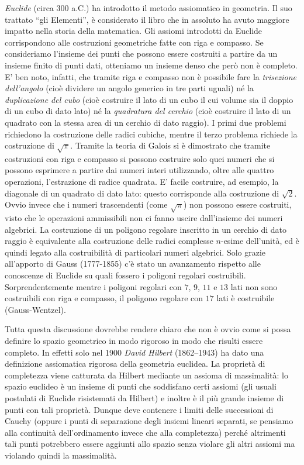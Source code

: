 \label{nota:Euclide}%
\label{nota:Hilbert}%
%
%
%
%
\emph{Euclide} (circa 300 a.C.) ha introdotto il metodo assiomatico in geometria. 
Il suo trattato ``gli Elementi'', è considerato il libro
che in assoluto ha avuto maggiore impatto nella storia della matematica.
Gli assiomi introdotti da Euclide corrispondono alle costruzioni geometriche fatte 
con riga e compasso.
Se consideriamo l'insieme dei punti che possono essere costruiti a partire da 
un insieme finito di punti dati, otteniamo un insieme denso che però 
non è completo. 
E' ben noto, infatti, che tramite riga e compasso non è possibile 
fare la \emph{trisezione dell'angolo} (cioè dividere 
un angolo generico in tre parti uguali)
né la \emph{duplicazione del cubo}
(cioè costruire il lato di un cubo il cui volume sia il doppio di un cubo di dato lato)
né la \emph{quadratura del cerchio} (cioè costruire il lato di un quadrato
con la stessa area di un cerchio di dato raggio).
I primi due problemi richiedono la costruzione delle radici cubiche, mentre 
il terzo problema richiede la costruzione di $\sqrt\pi$.
Tramite la teoria di Galois si è dimostrato che tramite costruzioni con riga e 
compasso si possono costruire solo quei numeri che si possono esprimere 
a partire dai numeri interi utilizzando, oltre alle quattro operazioni, 
l'estrazione di radice quadrata. 
E' facile costruire, ad esempio, la diagonale di un quadrato di dato lato: 
questo corrisponde alla costruzione di $\sqrt 2$.
Ovvio invece che i numeri trascendenti (come $\sqrt\pi$) non possono essere costruiti, visto 
che le operazioni ammissibili non ci fanno uscire dall'insieme dei numeri algebrici.
La costruzione di un poligono regolare inscritto in un cerchio di dato raggio 
è equivalente alla costruzione delle radici complesse $n$-esime dell'unità, ed 
è quindi legato alla costruibilità di particolari numeri algebrici. 
Solo grazie all'apporto di Gauss (1777-1855) c'è stato un avanzamento rispetto alle conoscenze di Euclide 
su quali fossero i poligoni regolari costruibili.
Sorprendentemente 
mentre i poligoni regolari con $7$, $9$, $11$ e $13$ lati non sono costruibili 
con riga e compasso, il poligono regolare con $17$ lati è costruibile
(Gauss-Wentzel). 

Tutta questa discussione dovrebbe rendere chiaro che non è ovvio come si possa 
definire lo spazio geometrico in modo rigoroso 
in modo che risulti essere completo. 
In effetti solo nel 1900 \emph{David Hilbert} (1862--1943) ha dato una definizione assiomatica rigorosa
della geometria euclidea. 
La proprietà di completezza viene catturata da Hilbert mediante un assioma di massimalità:
lo spazio euclideo è un insieme di punti che soddisfano certi assiomi 
(gli usuali postulati di Euclide risistemati da Hilbert) e inoltre 
è il più grande insieme di punti con tali proprietà. 
Dunque deve contenere i limiti delle successioni di Cauchy 
(oppure i punti di separazione degli insiemi lineari separati, 
se pensiamo alla continuità dell'ordinamento invece che alla completezza) 
perché altrimenti tali punti potrebbero essere aggiunti allo spazio senza 
violare gli altri assiomi ma violando quindi la massimalità.


